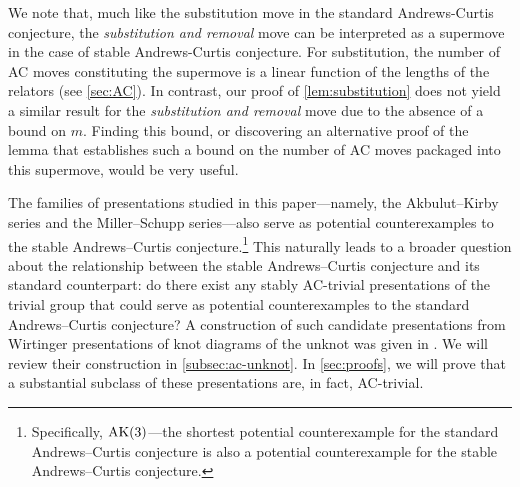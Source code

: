We note that, much like the substitution move in the standard Andrews-Curtis conjecture, the \emph{substitution and removal} move can be interpreted as a supermove in the case of stable Andrews-Curtis conjecture. For substitution, the number of AC moves constituting the supermove is a linear function of the lengths of the relators (see \autoref{sec:AC}). In contrast, our proof of \autoref{lem:substitution} does not yield a similar result for the \emph{substitution and removal} move due to the absence of a bound on $m$. Finding this bound, or discovering an alternative proof of the lemma that establishes such a bound on the number of AC moves packaged into this supermove, would be very useful.

The families of presentations studied in this paper---namely, the Akbulut--Kirby series and the Miller--Schupp series---also serve as potential counterexamples to the stable Andrews--Curtis conjecture.\footnote{Specifically, $\text{AK}(3)$---the shortest potential counterexample for the standard Andrews--Curtis conjecture is also a potential counterexample for the stable Andrews--Curtis conjecture.}
This naturally leads to a broader question about the relationship between the stable Andrews--Curtis conjecture and its standard counterpart: do there exist any stably AC-trivial presentations of the trivial group that could serve as potential counterexamples to the standard Andrews--Curtis conjecture? 
A construction of such candidate presentations from Wirtinger presentations of knot diagrams of the unknot was given in \cite{MMS}. We will review their construction in \autoref{subsec:ac-unknot}. In \autoref{sec:proofs}, we will prove that a substantial subclass of these presentations are, in fact, AC-trivial. 



